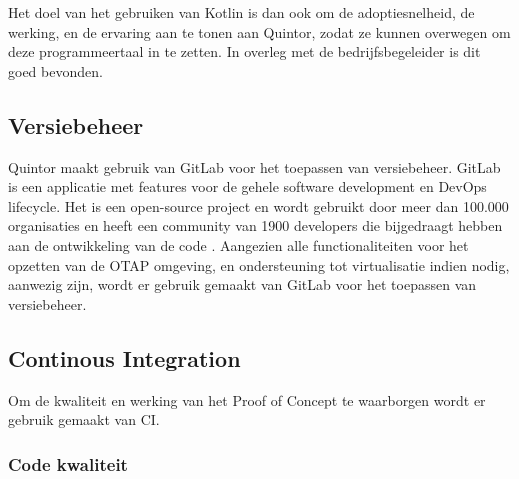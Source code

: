 Het doel van het gebruiken van Kotlin is dan ook om de adoptiesnelheid, de werking, en de ervaring aan te tonen aan Quintor, zodat ze kunnen overwegen om deze programmeertaal in te zetten. In overleg met de bedrijfsbegeleider is dit goed bevonden.

\subsection{Versiebeheer}

Quintor maakt gebruik van GitLab voor het toepassen van versiebeheer. GitLab is een applicatie met features voor de gehele software development en DevOps lifecycle. Het is een open-source project en wordt gebruikt door meer dan 100.000 organisaties en heeft een community van 1900 developers die bijgedraagt hebben aan de ontwikkeling van de code \citep{gitlab_about}. Aangezien alle functionaliteiten voor het opzetten van de \gls{OTAP} omgeving, en ondersteuning tot virtualisatie indien nodig, aanwezig zijn, wordt er gebruik gemaakt van GitLab voor het toepassen van versiebeheer.

\subsection{Continous Integration}

Om de kwaliteit en werking van het Proof of Concept te waarborgen wordt er gebruik gemaakt van \acrfull{CI}. %

\subsubsection{Code kwaliteit} %